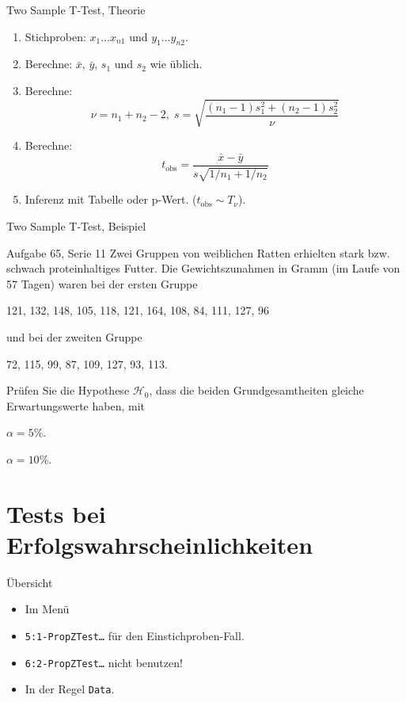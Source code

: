 \documentclass[handout]{beamer}
\newlength{\tikey}
\newcommand{\keystroke}[1]{\settowidth{\tikey}{\scriptsize #1}\psframebox[framearc=0.2]{\parbox{\tikey}{\scriptsize #1}}}
\begin{document}
\begin{frame}{Two Sample T-Test, Theorie}
\begin{enumerate}
\item Stichproben: $x_1\ldots x_{n1}$ und $y_1\ldots y_{n2}$.
\item Berechne: $\bar{x}$, $\bar{y}$, $s_1$ und $s_2$ wie üblich.
\item Berechne: 
$$
\nu=n_1+n_2-2,\;
s=\sqrt{\frac{(n_1-1)s_1^2+(n_2-1)s_2^2}{\nu}}
$$

\item Berechne:
$$
t_\text{obs}=\frac{\bar{x}-\bar{y}}{s\sqrt{1/n_1+1/n_2}}
$$
\item Inferenz mit Tabelle oder p-Wert. ($t_\text{obs}\sim T_\nu$).
\end{enumerate}
\end{frame}

\begin{frame}{Two Sample T-Test, Beispiel}
\begin{beamerboxesrounded}[shadow]{Aufgabe 65, Serie 11}
Zwei Gruppen von weiblichen Ratten erhielten stark bzw. schwach proteinhaltiges Futter.
Die Gewichtszunahmen in Gramm (im Laufe von 57 Tagen) waren bei der ersten Gruppe
\begin{center}
121, 132, 148, 105, 118, 121, 164, 108, 84, 111, 127, 96
\end{center}
und bei der zweiten Gruppe
\begin{center}
72, 115, 99, 87, 109, 127, 93, 113.
\end{center}

Prüfen Sie die Hypothese $\mathcal{H}_0$, dass die beiden Grundgesamtheiten gleiche
Erwartungswerte haben, mit
\begin{outline}
\item $\alpha = 5\%$.
\item $\alpha = 10\%$.
\end{outline}
\end{beamerboxesrounded}
\end{frame}

\section[Test bei E-W'keiten]{Tests bei Erfolgswahrscheinlichkeiten}
\begin{frame}{Übersicht}
\begin{itemize}
\item Im Menü \keystroke{F6}
\item \texttt{5:1-PropZTest\ldots} für den Einstichproben-Fall.
\item \texttt{6:2-PropZTest\ldots} nicht benutzen!
\item In der Regel \texttt{Data}.
\end{itemize}
\end{frame}
\end{document}
